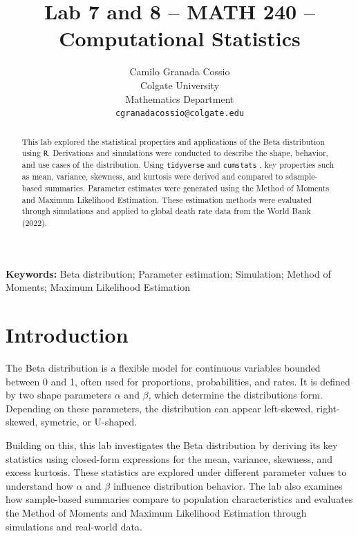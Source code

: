 \documentclass{article}\usepackage[]{graphicx}\usepackage[]{xcolor}
\begin{document}
\vspace{-1in}
\title{Lab 7 and 8 -- MATH 240 -- Computational Statistics}

\author{
  Camilo Granada Cossio \\
  Colgate University  \\
  Mathematics Department  \\
  {\tt cgranadacossio@colgate.edu}
}

\date{}

\maketitle

\begin{multicols}{2}
\begin{abstract}
This lab explored the statistical properties and applications of the Beta distribution using \texttt{R}. Derivations and simulations were conducted to describe the shape, behavior, and use cases of the distribution. Using \texttt{tidyverse} \citep{tidyverse} and \texttt{cumstats} \citep{cumstat}, key properties such as mean, variance, skewness, and kurtosis were derived and compared to sdample-based summaries. Parameter estimates were generated using the Method of Moments and Maximum Likelihood Estimation. These estimation methods were evaluated through simulations and applied to global death rate data from the World Bank (2022).
\end{abstract}

\noindent \textbf{Keywords:} Beta distribution; Parameter estimation; Simulation; Method of Moments; Maximum Likelihood Estimation

\section{Introduction}

\indent The Beta distribution is a flexible model for continuous variables bounded between 0 and 1, often used for proportions, probabilities, and rates. It is defined by two shape parameters $\alpha$ and $\beta$, which determine the distributions form. Depending on these parameters, the distribution can appear left-skewed, right-skewed, symetric, or U-shaped.

Building on this, this lab investigates the Beta distribution by deriving its key statistics using closed-form expressions for the mean, variance, skewness, and excess kurtosis. These statistics are explored under different parameter values to understand how $\alpha$ and $\beta$ influence distribution behavior. The lab also examines how sample-based summaries compare to population characteristics and evaluates the Method of Moments and Maximum Likelihood Estimation through simulations and real-world data.


\end{multicols}
\end{document}

